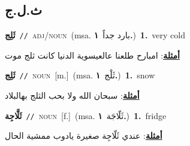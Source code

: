 \documentclass[10pt,a4paper,twoside]{article} %
\begin{document}
\begin{multicols}{2}
{{{{{{{{{\vspace{-3mm}
\subsection*{\color{blue}\foreignlanguage{arabic}{ث.ل.ج}\color{blue}{}} 

{\setlength\topsep{0pt}\textbf{\foreignlanguage{arabic}{ثَلِج}}\ {\color{gray}\texttt{//}\color{black}}\ \textsc{adj/noun}\ \color{gray}(msa. \foreignlanguage{arabic}{بارد جداً}~\foreignlanguage{arabic}{\textbf{١.}})\color{black}\ \textbf{1.}~very cold\  \begin{flushright}\color{gray}\foreignlanguage{arabic}{\textbf{\underline{\foreignlanguage{arabic}{أمثلة}}}: امبارح طلعنا عالعيسوية الدنيا كانت ثلج موت}\end{flushright}\color{black}} \vspace{2mm}

{\setlength\topsep{0pt}\textbf{\foreignlanguage{arabic}{ثَلِج}}\ {\color{gray}\texttt{//}\color{black}}\ \textsc{noun}\ [m.]\ \color{gray}(msa. \foreignlanguage{arabic}{ثَلْج}~\foreignlanguage{arabic}{\textbf{١.}})\color{black}\ \textbf{1.}~snow\  \begin{flushright}\color{gray}\foreignlanguage{arabic}{\textbf{\underline{\foreignlanguage{arabic}{أمثلة}}}: سبحان الله ولا بحب الثلج بهالبلاد}\end{flushright}\color{black}} \vspace{2mm}

{\setlength\topsep{0pt}\textbf{\foreignlanguage{arabic}{ثَلَّاجِة}}\ {\color{gray}\texttt{//}\color{black}}\ \textsc{noun}\ [f.]\ \color{gray}(msa. \foreignlanguage{arabic}{ثَلّاجَة}~\foreignlanguage{arabic}{\textbf{١.}})\color{black}\ \textbf{1.}~fridge\  \begin{flushright}\color{gray}\foreignlanguage{arabic}{\textbf{\underline{\foreignlanguage{arabic}{أمثلة}}}: عندي ثَلّاجِة صغيرة يادوب ممشية الحال}\end{flushright}\color{black}} \vspace{2mm}

}}}}}}}}}
\end{multicols}
\end{document}
